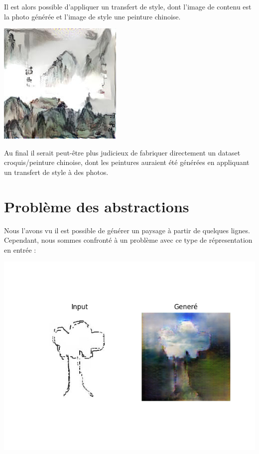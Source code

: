 \documentclass[a4paper, 12pt]{book}
\begin{document}
Il est alors possible d'appliquer un transfert de style, dont l'image de contenu est la photo générée et l'image de style une peinture chinoise.

\includegraphics[width=0.7\linewidth]{images/pix2pix-t1-ts.jpg}

Au final il serait peut-être plus judicieux de fabriquer directement un dataset croquis/peinture chinoise, dont les peintures auraient été générées en appliquant un transfert de style à des photos.


\section{Problème des abstractions}

Nous l'avons vu il est possible de générer un paysage à partir de quelques lignes. Cependant, nous sommes confronté à un problème avec ce type de répresentation en entrée : 

\includegraphics[width=0.7\linewidth]{images/pix2pix-fail.png}
\end{document}
